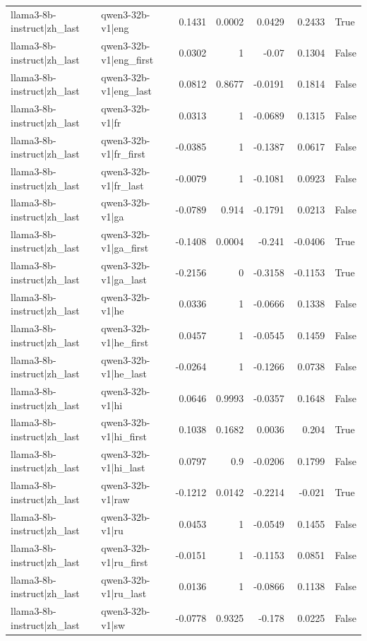 \begin{table}
\begin{tabular}{l l r r r r l}
llama3-8b-instruct|zh_last & qwen3-32b-v1|eng & 0.1431 & 0.0002 & 0.0429 & 0.2433 & True \\
llama3-8b-instruct|zh_last & qwen3-32b-v1|eng_first & 0.0302 & 1 & -0.07 & 0.1304 & False \\
llama3-8b-instruct|zh_last & qwen3-32b-v1|eng_last & 0.0812 & 0.8677 & -0.0191 & 0.1814 & False \\
llama3-8b-instruct|zh_last & qwen3-32b-v1|fr & 0.0313 & 1 & -0.0689 & 0.1315 & False \\
llama3-8b-instruct|zh_last & qwen3-32b-v1|fr_first & -0.0385 & 1 & -0.1387 & 0.0617 & False \\
llama3-8b-instruct|zh_last & qwen3-32b-v1|fr_last & -0.0079 & 1 & -0.1081 & 0.0923 & False \\
llama3-8b-instruct|zh_last & qwen3-32b-v1|ga & -0.0789 & 0.914 & -0.1791 & 0.0213 & False \\
llama3-8b-instruct|zh_last & qwen3-32b-v1|ga_first & -0.1408 & 0.0004 & -0.241 & -0.0406 & True \\
llama3-8b-instruct|zh_last & qwen3-32b-v1|ga_last & -0.2156 & 0 & -0.3158 & -0.1153 & True \\
llama3-8b-instruct|zh_last & qwen3-32b-v1|he & 0.0336 & 1 & -0.0666 & 0.1338 & False \\
llama3-8b-instruct|zh_last & qwen3-32b-v1|he_first & 0.0457 & 1 & -0.0545 & 0.1459 & False \\
llama3-8b-instruct|zh_last & qwen3-32b-v1|he_last & -0.0264 & 1 & -0.1266 & 0.0738 & False \\
llama3-8b-instruct|zh_last & qwen3-32b-v1|hi & 0.0646 & 0.9993 & -0.0357 & 0.1648 & False \\
llama3-8b-instruct|zh_last & qwen3-32b-v1|hi_first & 0.1038 & 0.1682 & 0.0036 & 0.204 & True \\
llama3-8b-instruct|zh_last & qwen3-32b-v1|hi_last & 0.0797 & 0.9 & -0.0206 & 0.1799 & False \\
llama3-8b-instruct|zh_last & qwen3-32b-v1|raw & -0.1212 & 0.0142 & -0.2214 & -0.021 & True \\
llama3-8b-instruct|zh_last & qwen3-32b-v1|ru & 0.0453 & 1 & -0.0549 & 0.1455 & False \\
llama3-8b-instruct|zh_last & qwen3-32b-v1|ru_first & -0.0151 & 1 & -0.1153 & 0.0851 & False \\
llama3-8b-instruct|zh_last & qwen3-32b-v1|ru_last & 0.0136 & 1 & -0.0866 & 0.1138 & False \\
llama3-8b-instruct|zh_last & qwen3-32b-v1|sw & -0.0778 & 0.9325 & -0.178 & 0.0225 & False \\

\end{tabular}
\end{table}
